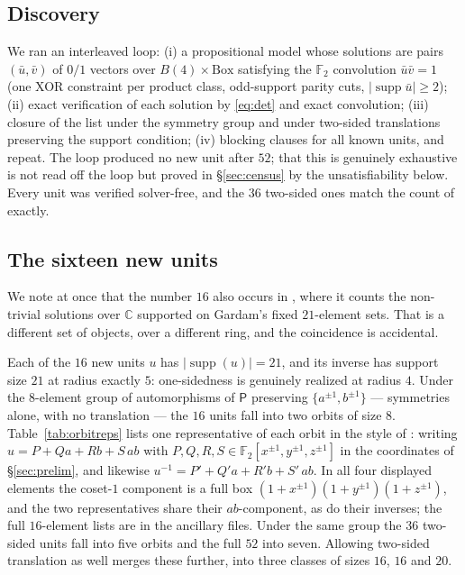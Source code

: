 \documentclass[11pt]{amsart}
\theoremstyle{definition}
\newcommand{\F}{\mathbb{F}}
\newcommand{\C}{\mathbb{C}}
\renewcommand{\P}{\mathsf{P}}
\newcommand{\Ball}[1]{B(#1)}
\newcommand{\supp}{\operatorname{supp}}
\newcommand{\BOX}{\mathrm{Box}}
\begin{document}
\subsection{Discovery}
We ran an interleaved loop: (i) a propositional model whose solutions are
pairs $(\bar u,\bar v)$ of $0/1$ vectors over $\Ball4\times\BOX$ satisfying the
$\F_2$ convolution $\bar u\bar v=1$ (one XOR constraint per product class,
odd-support parity cuts, $|\supp\bar u|\ge2$); (ii) exact verification of each
solution by \eqref{eq:det} and exact convolution; (iii) closure of the list
under the symmetry group and under two-sided translations preserving the
support condition; (iv) blocking clauses for all known units, and repeat. The loop
produced no new unit after $52$; that this is genuinely exhaustive is not read
off the loop but proved in \S\ref{sec:census} by the unsatisfiability below.
Every unit was verified solver-free, and the $36$ two-sided ones match the
count of \cite{DLNV2026} exactly.

\subsection{The sixteen new units}
We note at once that the number $16$ also occurs in
\cite[\S3]{GardamComplex2023}, where it counts the non-trivial solutions over
$\C$ supported on Gardam's fixed $21$-element sets. That is a different set of
objects, over a different ring, and the coincidence is accidental.

Each of the $16$ new units $u$ has $|\supp(u)|=21$, and its inverse has
support size $21$ at radius exactly $5$: one-sidedness is genuinely realized at
radius $4$. Under the $8$-element group of automorphisms of $\P$ preserving
$\{a^{\pm1},b^{\pm1}\}$ --- symmetries alone, with no translation --- the $16$
units fall into two orbits of size $8$. Table~\ref{tab:orbitreps} lists one
representative of each orbit in the style of \cite{DLNV2026}: writing
$u=P+Qa+Rb+S\,ab$ with $P,Q,R,S\in\F_2[x^{\pm1},y^{\pm1},z^{\pm1}]$ in the
coordinates of \S\ref{sec:prelim}, and likewise
$u^{-1}=P'+Q'a+R'b+S'\,ab$. In all four displayed elements the coset-$1$
component is a full box $(1+x^{\pm1})(1+y^{\pm1})(1+z^{\pm1})$, and the two
representatives share their $ab$-component, as do their inverses; the full
$16$-element lists are in the ancillary files. Under the same group the $36$
two-sided units fall into five orbits and the full $52$ into seven. Allowing
two-sided translation as well merges these further, into three classes of
sizes $16$, $16$ and $20$.
\end{document}
